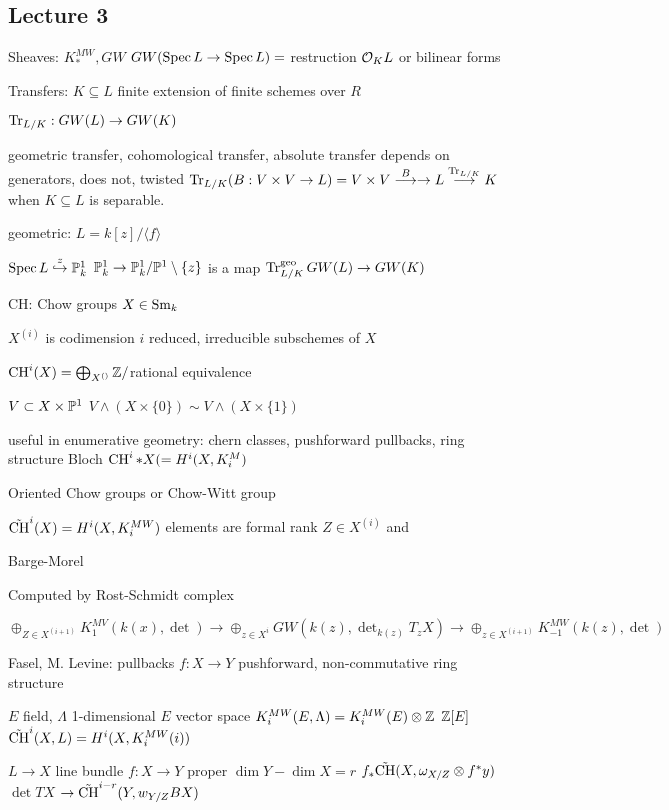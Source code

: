 \newpage
\subsection{Lecture 3}

Sheaves: $K^{MW}_*, GW$
$GW(\spec L \to \spec L)= $ restruction $\O_K L$ or bilinear forms

Transfers: $K \subseteq L$ finite extension of finite schemes over $R$

$\tr_{L/K}: GW(L) \to GW(K)$

geometric transfer, cohomological transfer, absolute transfer
depends on generators, does not, twisted
$\tr_{L/K}(B: V \times V \to L)= V \times V \ma{B} \to L \ma{\tr_{L/K}} K$ when $K \subseteq L$ is separable. 


geometric: $L= k[z]/ \langle f \rangle$

$\spec L \stackrel{z}{\hookrightarrow} \P_k^1$
$\P^1_k \to \P_k^1/\P^1 \setminus \{z\}$ is a map $\tr_{L/K}^\text{geo} GW(L) \to GW(K)$

CH: Chow groups $X \in \sm_k$

$X^{(i)}$ is codimension $i$ reduced, irreducible subschemes of $X$

$\ch^i(X)= \bigoplus_{X^{()}} \Z/$rational equivalence

$V \subset X \times \P^1$
$V \wedge (X \times \{0\}) \sim V \wedge (X \times \{1\})$

useful in enumerative geometry: chern classes, pushforward pullbacks, ring structure
Bloch $\ch^i*X(= H^i(X,K_i^{M})$ 



Oriented Chow groups or Chow-Witt group

$\tilde{\ch}^i(X)= H^i(X, K_i^{MW})$ elements are formal rank $Z \in X^{(i)}$ and 

Barge-Morel

Computed by Rost-Schmidt complex

$\oplus_{Z \in X^{(i+1)}} K_1^{MV}(k(x),\det) \to \oplus_{z \in X^{i}} GW(k(z),\det_{k(z)} T_zX) \to \oplus_{z \in X^{(i+1)}} K_{-1}^{MW} (k(z),\det)$


Fasel, M. Levine: pullbacks $f: X \to Y$ pushforward, non-commutative ring structure

$E$ field, $\Lambda$ 1-dimensional $E$ vector space
$K_i^{MW}(E,\Lambda)= K_i^{MW}(E) \otimes \Z$ $\Z[E]$
$\tilde{\ch}^i(X,L)= H^i(X,K_i^{MW}(i))$


$L \to X$ line bundle
$f: X \to Y$ proper $\dim Y - \dim X=r$
$f_* \tilde{\ch}(X, \omega_{X/Z} \otimes f^* y)$
$\det TX$
$\to \tilde{\ch}^{i-r}(Y, w_{Y/Z} BX)$


